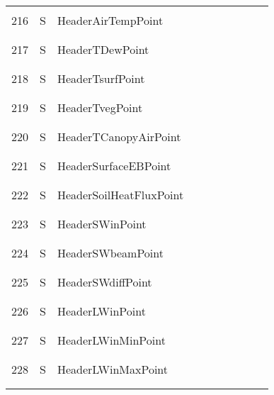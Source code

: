 \begin{longtable}{|c|c|l|c|c|c|c|p{}|c|p{}|}
&&&&&&&&&\\
216 & S & HeaderAirTempPoint & & & & & & & \\
&&&&&&&&&\\\hline%
&&&&&&&&&\\
217 & S & HeaderTDewPoint & & & & & & & \\
&&&&&&&&&\\\hline%
&&&&&&&&&\\
218 & S & HeaderTsurfPoint & & & & & & & \\
&&&&&&&&&\\\hline%
&&&&&&&&&\\
219 & S & HeaderTvegPoint & & & & & & & \\
&&&&&&&&&\\\hline%
&&&&&&&&&\\
220 & S & HeaderTCanopyAirPoint & & & & & & & \\
&&&&&&&&&\\\hline%
&&&&&&&&&\\
221 & S & HeaderSurfaceEBPoint & & & & & & & \\
&&&&&&&&&\\\hline%
&&&&&&&&&\\
222 & S & HeaderSoilHeatFluxPoint & & & & & & & \\
&&&&&&&&&\\\hline%
&&&&&&&&&\\
223 & S & HeaderSWinPoint & & & & & & & \\
&&&&&&&&&\\\hline%
&&&&&&&&&\\
224 & S & HeaderSWbeamPoint & & & & & & & \\
&&&&&&&&&\\\hline%
&&&&&&&&&\\
225 & S & HeaderSWdiffPoint & & & & & & & \\
&&&&&&&&&\\\hline%
&&&&&&&&&\\
226 & S & HeaderLWinPoint & & & & & & & \\
&&&&&&&&&\\\hline%
&&&&&&&&&\\
227 & S & HeaderLWinMinPoint & & & & & & & \\
&&&&&&&&&\\\hline%
&&&&&&&&&\\
228 & S & HeaderLWinMaxPoint & & & & & & & \\
&&&&&&&&&\\\hline%
&&&&&&&&&\\

\end{longtable}

